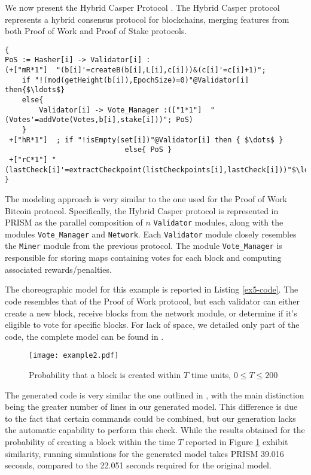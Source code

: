 \begin{comment}
\begin{wrapfigure}[12]{l}{4.5cm}
	\texttt{[image: ethereum.pdf]}	
\end{wrapfigure} 
\end{comment}
We now present the Hybrid Casper Protocol \cite{DBLP:journals/distribledger/GallettaLMV23}. The Hybrid Casper protocol represents a hybrid consensus protocol for blockchains, merging features from both Proof of Work and Proof of Stake protocols. 
\begin{lstlisting}[style=chor-color,tabsize=2,breaklines=true, postbreak=\mbox{\textcolor{red}{$\hookrightarrow$}\space},	caption={Excerpt of the Hybrid Casper Protocol as a choreography},captionpos=b,label={ex5-code}]
{
PoS := Hasher[i] -> Validator[i] :
(+["mR*1"]  "(b[i]'=createB(b[i],L[i],c[i]))&(c[i]'=c[i]+1)"; 
	if "!(mod(getHeight(b[i]),EpochSize)=0)"@Validator[i] then{$\ldots$}
	else{
		Validator[i] -> Vote_Manager :(["1*1"]  "(Votes'=addVote(Votes,b[i],stake[i]))"; PoS)
	}
 +["hR*1"]  ; if "!isEmpty(set[i])"@Validator[i] then { $\dots$ }
 							else{ PoS }
 +["rC*1"] "(lastCheck[i]'=extractCheckpoint(listCheckpoints[i],lastCheck[i]))"$\ldots$
}
\end{lstlisting}
The modeling approach is very similar to the one used for the Proof of Work Bitcoin protocol. Specifically, the Hybrid Casper protocol is represented in PRISM as the parallel composition of $n$ \texttt{Validator} modules, along with the modules \texttt{Vote\_Manager} and \texttt{Network}. Each \texttt{Validator} module closely resembles the \texttt{Miner} module from the previous protocol. The module \texttt{Vote\_Manager} is responsible for storing maps containing votes for each block and computing associated rewards/penalties.

The choreographic model for this example is reported in Listing \ref{ex5-code}. 
The code resembles that of the Proof of Work protocol, but each validator can either create a new block, receive blocks from the network module, or determine if it's eligible to vote for specific blocks.
For lack of space, we detailed only part of the code, the complete model can be found in \cite{repository}.


\begin{figure}[h]
	\centering
	\texttt{[image: example2.pdf]}	
	\caption{Probability that a block is created within $T$ time units, $0\leq T\leq 200$}
	\label{ex5-res}
	\end{figure}
        The generated code is very similar the one outlined in
        \cite{DBLP:journals/distribledger/GallettaLMV23}, with the
        main distinction being the greater number of lines in our
        generated model.  This difference is due to the fact that
        certain commands could be combined, but our generation lacks
        the automatic capability to perform this check. While the
        results obtained for the probability of creating a block within the time $T$
        reported in Figure \ref{ex5-res} exhibit similarity, running
        simulations for the generated model takes PRISM 39.016
        seconds, compared to the 22.051 seconds required for the
        original model.



